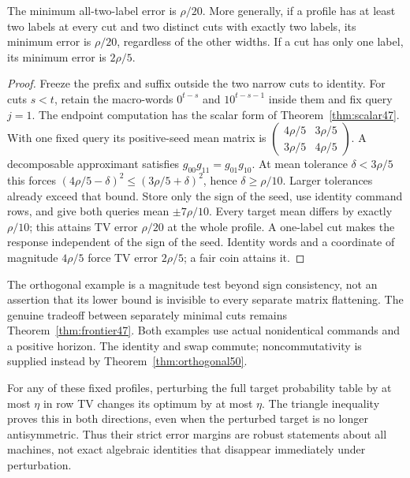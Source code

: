 \begin{proposition}
\label{prop:orthogonal49}
The minimum all-two-label error is $\rho/20$. More generally, if a
profile has at least two labels at every cut and two distinct cuts
with exactly two labels, its minimum error is $\rho/20$, regardless
of the other widths. If a cut has only one label, its minimum error
is $2\rho/5$.
\end{proposition}
\begin{proof}
Freeze the prefix and suffix outside the two narrow cuts to identity.
For cuts $s<t$, retain the macro-words $0^{t-s}$ and $10^{t-s-1}$ inside them and fix query $j=1$.
The endpoint computation has the scalar form of
Theorem~\ref{thm:scalar47}. With one fixed query its positive-seed
mean matrix is
$\left(\begin{smallmatrix}4\rho/5&3\rho/5\\
3\rho/5&4\rho/5\end{smallmatrix}\right)$.
A decomposable approximant satisfies $g_{00}g_{11}=g_{01}g_{10}$.
At mean tolerance $\delta<3\rho/5$ this forces
$(4\rho/5-\delta)^2\le(3\rho/5+\delta)^2$, hence
$\delta\ge\rho/10$. Larger tolerances already exceed that bound.
Store only the sign of the seed, use identity command rows, and give
both queries mean $\pm7\rho/10$. Every target mean differs by exactly
$\rho/10$; this attains TV error $\rho/20$ at the whole profile.
A one-label cut makes the response independent of the sign of the
seed. Identity words and a coordinate of magnitude $4\rho/5$ force
TV error $2\rho/5$; a fair coin attains it.
\end{proof}

The orthogonal example is a magnitude test beyond sign consistency,
not an assertion that its lower bound is invisible to every separate
matrix flattening. The genuine tradeoff between separately minimal
cuts remains Theorem~\ref{thm:frontier47}. Both examples use actual nonidentical commands and a positive horizon. The identity and swap commute; noncommutativity is supplied instead by Theorem~\ref{thm:orthogonal50}.

For any of these fixed profiles, perturbing the full target probability
table by at most $\eta$ in row TV changes its optimum by at most $\eta$.
The triangle inequality proves this in both directions, even when the
perturbed target is no longer antisymmetric. Thus their strict error
margins are robust statements about all machines, not exact algebraic
identities that disappear immediately under perturbation.
